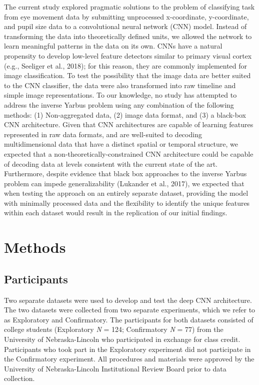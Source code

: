 \documentclass[
  english,
  man,floatsintext]{apa6}
\begin{document}
The current study explored pragmatic solutions to the problem of classifying task from eye movement data by submitting unprocessed x-coordinate, y-coordinate, and pupil size data to a convolutional neural network (CNN) model. Instead of transforming the data into theoretically defined units, we allowed the network to learn meaningful patterns in the data on its own. CNNs have a natural propensity to develop low-level feature detectors similar to primary visual cortex (e.g., Seeliger et al., 2018); for this reason, they are commonly implemented for image classification. To test the possibility that the image data are better suited to the CNN classifier, the data were also transformed into raw timeline and simple image representations. To our knowledge, no study has attempted to address the inverse Yarbus problem using any combination of the following methods: (1) Non-aggregated data, (2) image data format, and (3) a black-box CNN architecture. Given that CNN architectures are capable of learning features represented in raw data formats, and are well-suited to decoding multidimensional data that have a distinct spatial or temporal structure, we expected that a non-theoretically-constrained CNN architecture could be capable of decoding data at levels consistent with the current state of the art. Furthermore, despite evidence that black box approaches to the inverse Yarbus problem can impede generalizability (Lukander et al., 2017), we expected that when testing the approach on an entirely separate dataset, providing the model with minimally processed data and the flexibility to identify the unique features within each dataset would result in the replication of our initial findings.

\section{Methods}
\subsection{Participants}

Two separate datasets were used to develop and test the deep CNN architecture. The two datasets were collected from two separate experiments, which we refer to as Exploratory and Confirmatory. The participants for both datasets consisted of college students (Exploratory \emph{N} = 124; Confirmatory \emph{N} = 77) from the University of Nebraska-Lincoln who participated in exchange for class credit. Participants who took part in the Exploratory experiment did not participate in the Confirmatory experiment. All procedures and materials were approved by the University of Nebraska-Lincoln Institutional Review Board prior to data collection.
\end{document}
